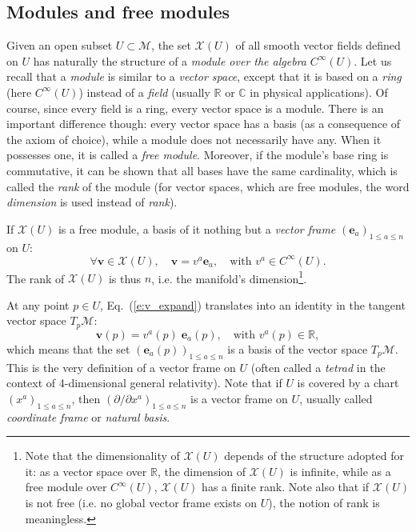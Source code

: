 \documentclass[a4paper]{jpconf}
\newcommand{\be}{\begin{equation}}
\newcommand{\ee}{\end{equation}}
\newcommand{\w}[1]{\bm{#1}}
\begin{document}
\subsection{Modules and free modules} \label{s:modules}

Given an open subset $U\subset\mathcal{M}$, the set $\mathscr{X}(U)$
of all smooth vector fields defined on $U$ has naturally the structure of a 
\emph{module over the algebra} $C^\infty(U)$.
Let us recall that a \emph{module} is similar to a \emph{vector space}, except that it is based
on a \emph{ring} (here $C^\infty(U)$)
instead of a \emph{field} (usually $\mathbb{R}$ or
$\mathbb{C}$ in physical applications). Of course, since every field is a ring, every vector space is a module.
There is an important difference though: every vector space has a basis (as a 
consequence of the axiom of choice),
while a module does not necessarily have any. 
When it possesses one, it is called a \emph{free module}. 
Moreover, if the module's base ring is commutative, it can be shown that all
bases have the same
cardinality, which is called the \emph{rank} of the module 
(for vector spaces, which are free modules, the word \emph{dimension}
is used instead of \emph{rank}). 

If $\mathscr{X}(U)$ is a free module, a basis of it nothing but a \emph{vector frame}
$(\w{e}_a)_{1\leq a \leq n}$ on $U$:
\be \label{e:v_expand}
    \forall \w{v}\in\mathscr{X}(U),\quad \w{v} = v^a \w{e}_a,\quad\mbox{with\ } v^a \in C^\infty(U) .
\ee
The rank of $\mathscr{X}(U)$ is thus $n$, i.e. the manifold's 
dimension\footnote{Note that the dimensionality of $\mathscr{X}(U)$ depends
of the structure adopted for it: as a vector space over $\mathbb{R}$, the
dimension of $\mathscr{X}(U)$ is infinite, while as a free module over
$C^\infty(U)$, $\mathscr{X}(U)$ has a finite rank. Note also that if $\mathscr{X}(U)$
is not free (i.e. no global vector frame exists on $U$), the notion of rank 
is meaningless.}.

At any point $p\in U$, Eq.~(\ref{e:v_expand}) translates into an identity in 
the tangent vector space $T_p \mathcal{M}$:
\be 
    \w{v}(p) = v^a(p)  \; \w{e}_a(p),\quad\mbox{with\ } v^a(p) \in \mathbb{R} , 
\ee
which means that 
the set $(\w{e}_a(p))_{1\leq a \leq n}$ is a basis of the vector space $T_p \mathcal{M}$.
This is the very definition of a vector frame on $U$ (often called a \emph{tetrad} in
the context of 4-dimensional general relativity). Note that if $U$ is covered
by a chart $(x^a)_{1\leq a \leq n}$, then $(\partial/\partial x^a)_{1\leq a \leq n}$
is a vector frame on $U$, usually called \emph{coordinate frame}
or \emph{natural basis}. 
\end{document}

